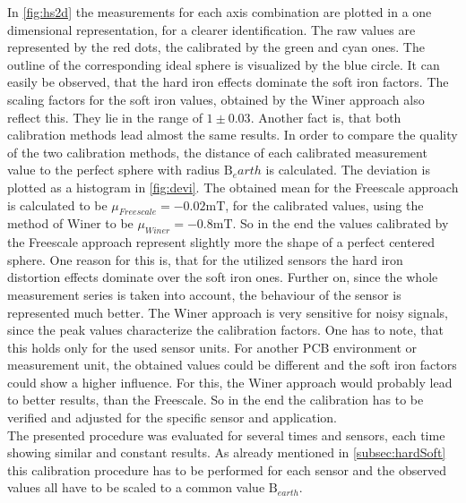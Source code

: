 In \ref{fig:hs2d} the measurements for each axis combination are plotted in a one dimensional representation, for a clearer identification. The raw values are represented by the red dots, the calibrated by the green and cyan ones. The outline of the corresponding ideal sphere is visualized by the blue circle. It can easily be observed, that the hard iron effects dominate the soft iron factors. The scaling factors for the soft iron values, obtained by the Winer approach also reflect this. They lie in the range of $ 1 \pm 0.03 $. Another fact is, that both calibration methods lead almost the same results. In order to compare the quality of the two calibration methods, the distance of each calibrated measurement value to the perfect sphere with radius $ \mathrm{B}_earth $ is calculated. The deviation is plotted as a histogram in \ref{fig:devi}. The obtained mean for the Freescale approach is calculated to be $ \mu_{Freescale} = -0.02\si{\milli \tesla} $, for the calibrated values, using the method of Winer to be $ \mu_{Winer} = -0.8\si{\milli \tesla} $. So in the end the values calibrated by the Freescale approach represent slightly more the shape of a perfect centered sphere. One reason for this is, that for the utilized sensors the hard iron distortion effects dominate over the soft iron ones. Further on, since the whole measurement series is taken into account, the behaviour of the sensor is represented much better. The Winer approach is very sensitive for noisy signals, since the peak values characterize the calibration factors. One has to note, that this holds only for the used sensor units. For another \ac{PCB} environment or measurement unit, the obtained values could be different and the soft iron factors could show a higher influence. For this, the Winer approach would probably lead to better results, than the Freescale. So in the end the calibration has to be verified and adjusted for the specific sensor and application.\\
The presented procedure was evaluated for several times and sensors, each time showing similar and constant results. As already mentioned in \ref{subsec:hardSoft} this calibration procedure has to be performed for each sensor and the observed values all have to be scaled to a common value $ \mathrm{B}_{earth} $.


